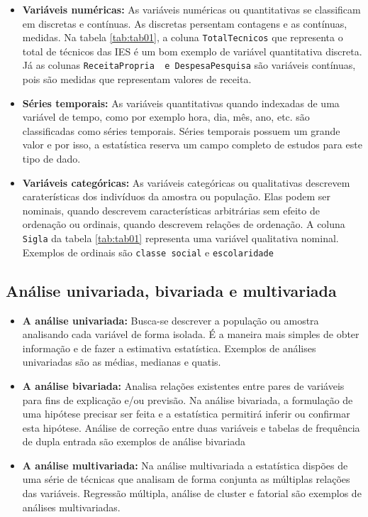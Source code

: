 \documentclass[12pt,]{style/krantz}
\theoremstyle{definition}
\theoremstyle{definition}
\theoremstyle{definition}
\theoremstyle{remark}
\begin{document}
\begin{itemize}
\item
  \textbf{Variáveis numéricas:} As variáveis numéricas ou quantitativas se classificam em discretas e contínuas. As discretas persentam contagens e as contínuas, medidas. Na tabela \ref{tab:tab01}, a coluna \texttt{TotalTecnicos} que representa o total de técnicos das IES é um bom exemplo de variável quantitativa discreta. Já as colunas \texttt{ReceitaPropria\ \ e\ DespesaPesquisa} são variáveis contínuas, pois são medidas que representam valores de receita.
\item
  \textbf{Séries temporais:} As variáveis quantitativas quando indexadas de uma variável de tempo, como por exemplo hora, dia, mês, ano, etc. são classificadas como séries temporais. Séries temporais possuem um grande valor e por isso, a estatística reserva um campo completo de estudos para este tipo de dado.
\item
  \textbf{Variáveis categóricas:} As variáveis categóricas ou qualitativas descrevem caraterísticas dos indivíduos da amostra ou população. Elas podem ser nominais, quando descrevem características arbitrárias sem efeito de ordenação ou ordinais, quando descrevem relações de ordenação. A coluna \texttt{Sigla} da tabela \ref{tab:tab01} representa uma variável qualitativa nominal. Exemplos de ordinais são \texttt{classe\ social} e \texttt{escolaridade}
\end{itemize}

\hypertarget{analise-univariada-bivariada-e-multivariada}{%
\subsection{Análise univariada, bivariada e multivariada}\label{analise-univariada-bivariada-e-multivariada}}

\begin{itemize}
\item
  \textbf{A análise univariada:} Busca-se descrever a população ou amostra analisando cada variável de forma isolada. É a maneira mais simples de obter informação e de fazer a estimativa estatística. Exemplos de análises univariadas são as médias, medianas e quatis.
\item
  \textbf{A análise bivariada:} Analisa relações existentes entre pares de variáveis para fins de explicação e/ou previsão. Na análise bivariada, a formulação de uma hipótese precisar ser feita e a estatística permitirá inferir ou confirmar esta hipótese. Análise de correção entre duas variáveis e tabelas de frequência de dupla entrada são exemplos de análise bivariada
\item
  \textbf{A análise multivariada:} Na análise multivariada a estatística dispões de uma série de técnicas que analisam de forma conjunta as múltiplas relações das variáveis. Regressão múltipla, análise de cluster e fatorial são exemplos de análises multivariadas.
\end{itemize}
\end{document}

